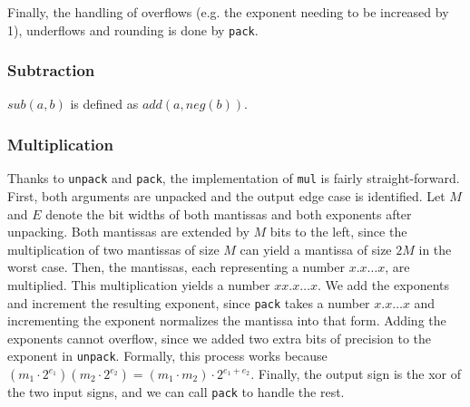 \documentclass[a4paper,UKenglish,cleveref, autoref, thm-restate]{lipics-v2019}
\begin{document}
Finally, the handling of overflows (e.g. the exponent needing to be increased by 1), underflows and rounding is done by \verb|pack|.


\subsubsection{Subtraction}
$sub(a, b)$ is defined as $add(a, neg(b))$.


\subsubsection{Multiplication}
Thanks to \verb|unpack| and \verb|pack|, the implementation of \verb|mul| is fairly straight-forward. First, both arguments are unpacked and the output edge case is identified. 
Let $M$ and $E$ denote the bit widths of both mantissas and both exponents after unpacking.
Both mantissas are extended by $M$ bits to the left, since the multiplication of two mantissas of size $M$ can yield a mantissa of size $2M$ in the worst case. Then, the mantissas, each representing a number $x.x\dots x$, are multiplied. This multiplication yields a number $xx.x\dots x$. We add the exponents and increment the resulting exponent, since \verb|pack| takes a number $x.x \dots x$ and incrementing the exponent normalizes the mantissa into that form. Adding the exponents cannot overflow, since we added two extra bits of precision to the exponent in \verb|unpack|. Formally, this process works because $(m_1 \cdot 2^{e_1})(m_2 \cdot 2^{e_2}) = (m_1 \cdot m_2) \cdot 2^{e_1 + e_2}$. Finally, the output sign is the xor of the two input signs, and we can call \verb|pack| to handle the rest.
\end{document}
